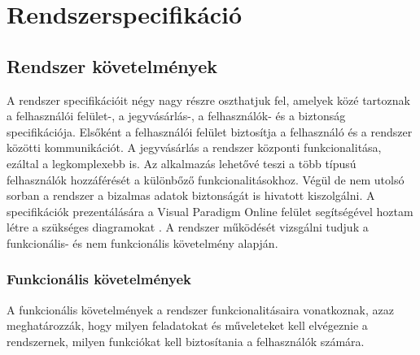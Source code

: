 \chapter{Rendszerspecifikáció} \label{fejezet3}

\section {Rendszer követelmények}

A rendszer specifikációit négy nagy részre oszthatjuk fel, amelyek közé tartoznak a felhasználói felület-, a jegyvásárlás-, a felhasználók- és a biztonság specifikációja. Elsőként a felhasználói felület biztosítja a felhasználó és a rendszer közötti kommunikációt. A jegyvásárlás a rendszer központi funkcionalitása, ezáltal a legkomplexebb is. Az alkalmazás lehetővé teszi a több típusú felhasználók hozzáférését a különbőző funkcionalitásokhoz. Végül de nem utolsó sorban a rendszer a bizalmas adatok biztonságát is hivatott kiszolgálni. A specifikációk prezentálására a Visual Paradigm Online felület segítségével hoztam létre a szükséges diagramokat \cite{VPO}. A rendszer működését vizsgálni tudjuk a funkcionális- és nem funkcionális követelmény alapján.
\subsection {Funkcionális követelmények} \label{rendszerFunkcionális}

A funkcionális követelmények a rendszer funkcionalitásaira vonatkoznak, azaz meghatározzák, hogy milyen feladatokat és műveleteket kell elvégeznie a rendszernek, milyen funkciókat kell biztosítania a felhasználók számára.


